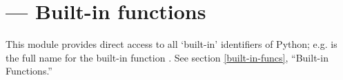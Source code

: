 \section{ ---
         Built-in functions}



This module provides direct access to all `built-in' identifiers of
Python; e.g.  is the full name for the built-in
function .  See section \ref{built-in-funcs}, ``Built-in
Functions.''
